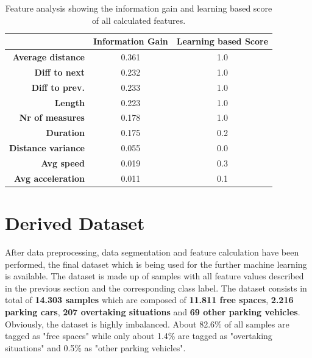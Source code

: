 \begin{table}


\centering
\bgroup
\def\arraystretch{1.4}
\begin{tabular}{| r || c | c |}
\hline
   & 
   \textbf{Information Gain} & 
   \textbf{Learning based Score} \\
\hline
  \textbf{Average distance} & 
   0.361 &
   1.0 \\
\hline
\textbf{Diff to next} & 
   0.232 &
   1.0 \\
\hline
\textbf{Diff to prev.} & 
   0.233 &
   1.0 \\
\hline
\textbf{Length} & 
   0.223 &
   1.0 \\
\hline
\textbf{Nr of measures} & 
   0.178 &
   1.0 \\
\hline
\textbf{Duration} & 
   0.175 &
   0.2 \\
\hline
\textbf{Distance variance} & 
   0.055 &
   0.0 \\
\hline
\textbf{Avg speed} & 
   0.019 &
   0.3 \\
\hline
\textbf{Avg acceleration} & 
   0.011 &
   0.1 \\
\hline


\end{tabular}
\egroup

\caption{Feature analysis showing the information gain and learning based score of all calculated features.}
\label{table:feature_analysis}
\end{table}















\section{Derived Dataset}
\label{sec:derived_dataset}

After data preprocessing, data segmentation and feature calculation have been performed, the final dataset which is being used for the further machine learning is available. The dataset is made up of samples with all feature values described in the previous section and the corresponding class label. The dataset consists in total of \textbf{14.303 samples} which are composed of \textbf{11.811 free spaces}, \textbf{2.216 parking cars}, \textbf{207 overtaking situations} and \textbf{69 other parking vehicles}. 
Obviously, the dataset is highly imbalanced. About 82.6\% of all samples are tagged as "free spaces" while only about 1.4\% are tagged as "overtaking situations" and 0.5\% as "other parking vehicles". 






